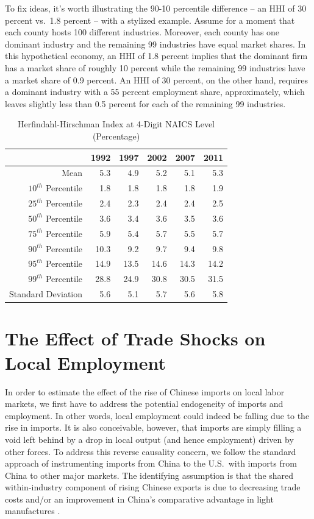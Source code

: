 \documentclass[onehalfspacing,11pt]{article}
\begin{document}
To fix ideas, it's worth illustrating the 90-10 percentile difference -- an HHI of 30 percent vs.~1.8 percent -- with a stylized example. Assume for a moment that each county hosts 100 different industries. Moreover, each county has one dominant industry and the remaining 99 industries have equal market shares. In this hypothetical economy, an HHI of 1.8 percent implies that the dominant firm has a market share of roughly 10 percent while the remaining 99 industries have a market share of 0.9 percent. An HHI of 30 percent, on the other hand, requires a dominant industry with a 55 percent employment share, approximately, which leaves slightly less than 0.5 percent for each of the remaining 99 industries.

\begin{table}
  \centering 
  \begin{tabular*}{.85\textwidth}{@{\extracolsep{\fill}} rrrrrr}
  \toprule
& 1992 & 1997 & 2002 & 2007 & 2011 \\
\midrule
Mean   			 & 5.3 & 4.9 & 5.2 & 5.1 & 5.3\\
$10^{th}$ Percentile   & 1.8 & 1.8 & 1.8 & 1.8 & 1.9 \\
$25^{th}$ Percentile   & 2.4 & 2.3 & 2.4 & 2.4 & 2.5 \\
$50^{th}$ Percentile   & 3.6 & 3.4 & 3.6 & 3.5 & 3.6 \\
$75^{th}$ Percentile   & 5.9 & 5.4 & 5.7 & 5.5 & 5.7 \\
$90^{th}$ Percentile   & 10.3 & 9.2 & 9.7 & 9.4 & 9.8 \\
$95^{th}$ Percentile   & 14.9 & 13.5 & 14.6 & 14.3 & 14.2 \\
$99^{th}$ Percentile   & 28.8 & 24.9 & 30.8 & 30.5 & 31.5\\
Standard Deviation	 & 5.6 & 5.1 & 5.7 & 5.6 & 5.8 \\
\bottomrule
\end{tabular*}
  \caption{Herfindahl-Hirschman Index at 4-Digit NAICS Level (Percentage)}\label{tab:hhi4}
\end{table}

\section{The Effect of Trade Shocks on Local Employment}
In order to estimate the effect of the rise of Chinese imports on local labor markets, we first have to address the potential endogeneity of imports and employment. In other words, local employment could indeed be falling due to the rise in imports. It is also conceivable, however, that imports are simply filling a void left behind by a drop in local output (and hence employment) driven by other forces. To address this reverse causality concern, we follow the standard approach of instrumenting imports from China to the U.S.~with imports from China to other major markets. The identifying assumption is that the shared within-industry component of rising Chinese exports is due to decreasing trade costs and/or an improvement in China's comparative advantage in light manufactures \citep[see][for a detailed discussion of the instrumental variable strategy]{Autor:2013}.
\end{document}

